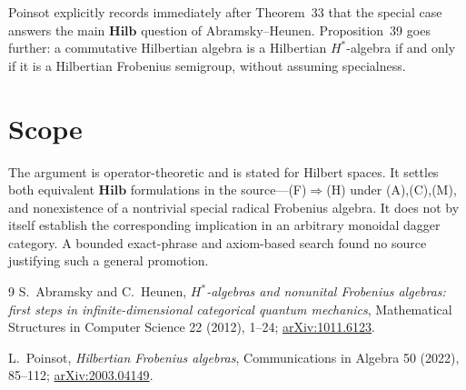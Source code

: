\documentclass[10pt]{article}
\newcommand{\Hilb}{\mathbf{Hilb}}
\begin{document}
Poinsot explicitly records immediately after Theorem~33 that the special
case answers the main $\Hilb$ question of Abramsky--Heunen.  Proposition~39
goes further: a commutative Hilbertian algebra is a Hilbertian $H^*$-algebra
if and only if it is a Hilbertian Frobenius semigroup, without assuming
specialness.

\section*{Scope}

The argument is operator-theoretic and is stated for Hilbert spaces.  It
settles both equivalent $\Hilb$ formulations in the source---(F)$\Rightarrow$(H)
under (A),(C),(M), and nonexistence of a nontrivial special radical Frobenius
algebra.  It does not by itself establish the corresponding implication in
an arbitrary monoidal dagger category.  A bounded exact-phrase and
axiom-based search found no source justifying such a general promotion.

{\small
\begin{thebibliography}{9}
S.~Abramsky and C.~Heunen,
\emph{$H^*$-algebras and nonunital Frobenius algebras: first steps in
infinite-dimensional categorical quantum mechanics},
Mathematical Structures in Computer Science 22 (2012), 1--24;
\href{https://arxiv.org/abs/1011.6123}{arXiv:1011.6123}.

L.~Poinsot,
\emph{Hilbertian Frobenius algebras},
Communications in Algebra 50 (2022), 85--112;
\href{https://arxiv.org/abs/2003.04149}{arXiv:2003.04149}.
\end{thebibliography}
}
\end{document}
